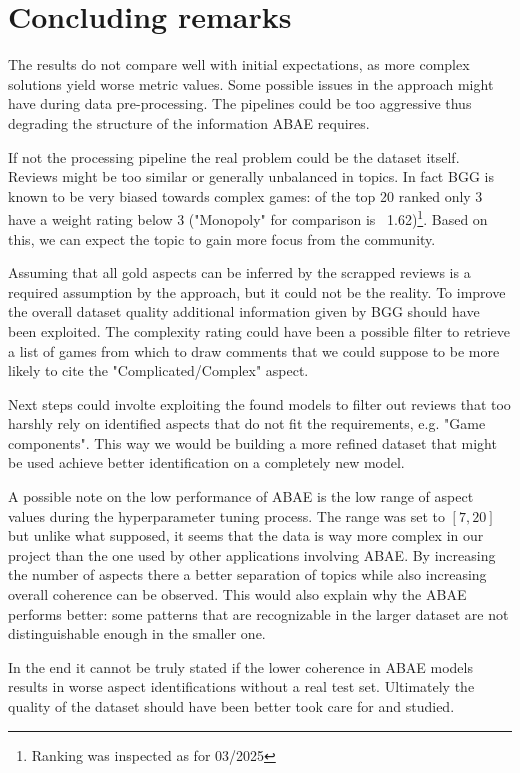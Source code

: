 \section{Concluding remarks}
The results do not compare well with initial expectations, as more complex solutions yield worse metric values.
Some possible issues in the approach might have during data pre-processing.
The pipelines could be too aggressive thus degrading the structure of the information ABAE requires.

If not the processing pipeline the real problem could be the dataset itself.
Reviews might be too similar or generally unbalanced in topics.
In fact BGG is known to be very biased towards complex games: of the top 20 ranked
only 3 have a weight rating below 3 ("Monopoly" for comparison is ~1.62)\footnote{Ranking was inspected as for 03/2025}.
Based on this, we can expect the topic to gain more focus from the community.

Assuming that all gold aspects can be inferred by the scrapped reviews
is a required assumption by the approach, but it could not be the reality.
To improve the overall dataset quality additional information given by BGG should have been exploited.
The complexity rating could have been a possible filter to retrieve a list of games from which to draw
comments that we could suppose to be more likely to cite the "Complicated/Complex" aspect.

Next steps could involte exploiting the found models to filter out reviews that too harshly rely
on identified aspects that do not fit the requirements, e.g. "Game components".
This way we would be building a more refined dataset that might be used achieve better identification on a completely new model.

A possible note on the low performance of ABAE is the low range of aspect values
during the hyperparameter tuning process.
The range was set to $[7,20]$ but unlike what supposed, it seems that the data is way more complex in our
project than the one used by other applications involving ABAE.
By increasing the number of aspects there
a better separation of topics while also increasing overall coherence can be observed.
This would also explain why the  ABAE performs better:
some patterns that are recognizable in the larger dataset are not distinguishable enough in the smaller one.

In the end it cannot be truly stated if the lower coherence in ABAE models results
in worse aspect identifications without a real test set.
Ultimately the quality of the dataset should have been better took care for and studied.


